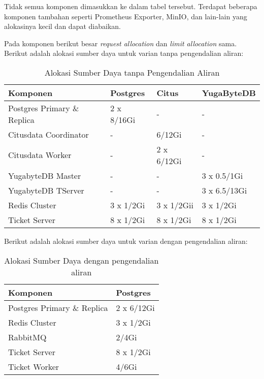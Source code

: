 Tidak semua komponen dimasukkan ke dalam tabel tersebut. Terdapat beberapa komponen tambahan seperti Prometheus Exporter, MinIO, dan lain-lain yang alokasinya kecil dan dapat diabaikan.

Pada komponen berikut besar \textit{request allocation} dan \textit{limit allocation} sama. Berikut adalah alokasi sumber daya untuk varian tanpa pengendalian aliran:

\begin{table}[htbp]
    \centering
    \caption{Alokasi Sumber Daya tanpa Pengendalian Aliran}
    \label{tab:nofc-allocation}
    \begin{tabular}{|l|l|l|l|}
        \hline
        \textbf{Komponen}           & \textbf{Postgres} & \textbf{Citus} & \textbf{YugaByteDB} \\ \hline
        Postgres Primary \& Replica & 2 x 8/16Gi        & -              & -                   \\ \hline
        Citusdata Coordinator       & -                 & 6/12Gi        & -                    \\ \hline
        Citusdata Worker            & -                 & 2 x 6/12Gi      & -                  \\ \hline
        YugabyteDB Master           & -                 & -              & 3 x 0.5/1Gi             \\ \hline
        YugabyteDB TServer          & -                 & -              & 3 x 6.5/13Gi            \\ \hline
        Redis Cluster               & 3 x 1/2Gi    & 3 x 1/2Gii & 3 x 1/2Gi                   \\ \hline
        Ticket Server              & 8 x 1/2Gi         & 8 x 1/2Gi      & 8 x 1/2Gi           \\ \hline
    \end{tabular}
\end{table}

\pagebreak

Berikut adalah alokasi sumber daya untuk varian dengan pengendalian aliran:

\begin{table}[htbp]
    \centering
    \caption{Alokasi Sumber Daya dengan pengendalian aliran}
    \label{tab:service_comparison_fc}
    \begin{tabular}{|l|l|}
        \hline
        \textbf{Komponen}           & \textbf{Postgres}     \\ \hline
        Postgres Primary \& Replica & 2 x 6/12Gi            \\ \hline
        Redis Cluster               & 3 x 1/2Gi             \\ \hline
        RabbitMQ                    & 2/4Gi                 \\ \hline
        Ticket Server               & 8 x 1/2Gi             \\ \hline
        Ticket Worker               & 4/6Gi                 \\ \hline
    \end{tabular}
\end{table}

